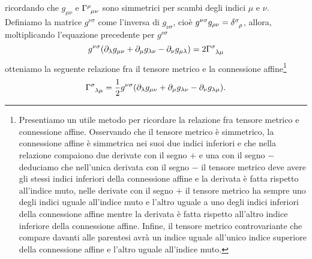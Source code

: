 ricordando che $g_{\mu\nu}$ e $\tensor{\Gamma}{^{\rho}_{\mu\nu}}$ sono
simmetrici per scambi degli indici $\mu$ e $\nu$.  Definiamo la matrice
$g^{\nu\sigma}$ come l'inversa di $g_{\nu\sigma}$, cioè
$g^{\nu\sigma}g_{\rho\nu} = \tensor{\delta}{^{\sigma}_{\rho}}$, allora,
moltiplicando l'equazione precedente per $g^{\nu\sigma}$
\begin{equation}
  g^{\nu\sigma}(\partial_{\lambda}g_{\mu\nu} + \partial_{\mu}g_{\lambda\nu}
  - \partial_{\nu}g_{\mu\lambda}) = 2\tensor{\Gamma}{^{\sigma}_{\lambda\mu}}
\end{equation}
otteniamo la seguente relazione fra il tensore metrico e la
connessione
affine\footnote{Presentiamo un utile metodo per ricordare la relazione fra
  tensore metrico e connessione affine.  Osservando che il tensore metrico è
  simmetrico, la connessione affine è simmetrica nei suoi due indici inferiori e
  che nella relazione compaiono due derivate con il segno $+$ e una con il segno
  $-$ deduciamo che nell'unica derivata con il segno $-$ il tensore metrico deve
  avere gli stessi indici inferiori della connessione affine e la derivata è
  fatta rispetto all'indice muto, nelle derivate con il segno $+$ il tensore
  metrico ha sempre uno degli indici uguale all'indice muto e l'altro uguale a
  uno degli indici inferiori della connessione affine mentre la derivata è fatta
  rispetto all'altro indice inferiore della connessione affine.  Infine, il
  tensore metrico controvariante che compare davanti alle parentesi avrà un
  indice uguale all'unico indice superiore della connessione affine e l'altro
  uguale all'indice muto.}
\begin{equation}
  \tensor{\Gamma}{^{\sigma}_{\lambda\mu}} =
  \frac{1}{2} g^{\nu\sigma} (\partial_{\lambda}g_{\mu\nu}
  + \partial_{\mu}g_{\lambda\nu} - \partial_{\nu}g_{\lambda\mu}).
\end{equation}

